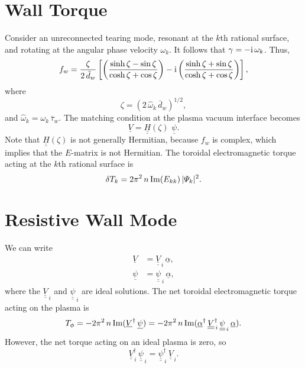 \documentclass[12pt,prb,aps,notitlepage]{revtex4-1}
\begin{document}
\section{Wall Torque}
Consider an unreconnected tearing mode, resonant at the $k$th rational surface, and rotating at the angular phase velocity $\omega_k$. It follows that
$\gamma=-{\rm i}\,\omega_k$. Thus, 
\begin{equation}
f_w = \frac{\zeta}{2\,\bar{d}_w}\left[\left(\frac{\sinh\zeta - \sin\zeta}{\cosh\zeta+\cos\zeta}\right)-{\rm i}\left(\frac{\sinh\zeta+ \sin\zeta}{\cosh\zeta+\cos\zeta}\right)\right],
\end{equation}
where
\begin{equation}
\zeta = (2\,\hat{\omega}_k\,\bar{d}_w)^{1/2},
\end{equation}
and $\hat{\omega}_k=\omega_k\,\bar{\tau}_w$. 
The matching condition at the plasma vacuum interface becomes 
\begin{equation}
\underline{V}= \underline{\underline{H}}(\zeta)\,\,\underline{\psi}.
\end{equation}
Note that $\underline{\underline{H}}(\zeta)$ is not generally Hermitian, because $f_w$ is complex,  which implies that
the $E$-matrix is not Hermitian. The toroidal electromagnetic torque acting at the $k$th rational surface is
\begin{equation}
\delta T_k = 2\pi^2\,n\,{\rm Im}(E_{kk})\,|{\mit\Psi}_k|^2.
\end{equation}

\section{Resistive Wall Mode}
We can write
\begin{align}
\underline{V}&= \underline{\underline{V}}_{\,i}\,\underline{\alpha},\\[0.5ex]
\underline{\psi}&= \underline{\underline{\psi}}_{\,i}\,\underline{\alpha},
\end{align}
where the $\underline{\underline{V}}_{\,i}$ and $\underline{\underline{\psi}}_{\,i}$ are ideal solutions.
The net toroidal electromagnetic torque acting on the plasma is
\begin{equation}
T_\phi= -2\pi^2\,n\,{\rm Im}(\underline{V}^\dag\,\underline{\psi})=-2\pi^2\,n\,{\rm Im}(\underline{\alpha}^\dag\,\underline{\underline{V}}_{\,i}^\dag
\,\underline{\underline{\psi}}_{\,i}\,\underline{\alpha}).
\end{equation}
However, the net torque acting on an ideal plasma is zero, so
\begin{equation}\label{e121}
\underline{\underline{V}}_{\,i}^\dag \,\underline{\underline{\psi}}_{\,i}=\underline{\underline{\psi}}_{\,i}^\dag \,\underline{\underline{V}}_{\,i}.
\end{equation}
\end{document}
